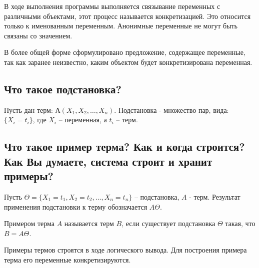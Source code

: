 \documentclass[a4paper,12pt]{article}
\begin{document}
В ходе выполнения программы выполняется связывание переменных с различными объектами, этот процесс называется конкретизацией. Это относится только к именованным переменным. Анонимные переменные не могут быть связаны со значением.

В более общей форме сформулировано предложение, содержащее переменные, так как заранее неизвестно, каким объектом будет конкретизирована переменная.
\subsection*{Что такое подстановка?}
Пусть дан терм: $А(X_1, X_2,  \dots ,X_n)$.
Подстановка - множество пар, вида: \\ $\{X _ i = t _ i\}$, где $X_i$ –   переменная, а $t_i$ –  терм.
\subsection*{Что такое пример терма? Как и когда строится? Как Вы думаете, система строит и хранит примеры?}
Пусть $\Theta =  \{X_1 = t_1, X_2= t_2, \dots , X_n = t_n \}$   –   подстановка, $A$ - терм. Результат применения подстановки к терму обозначается $A\Theta$.

Примером терма $A$ называется терм $B$, если существует подстановка $\Theta$ такая, что $B = A\Theta$.

Примеры термов строятся в ходе логического вывода. Для построения примера терма его переменные конкретизируются.
\end{document}
